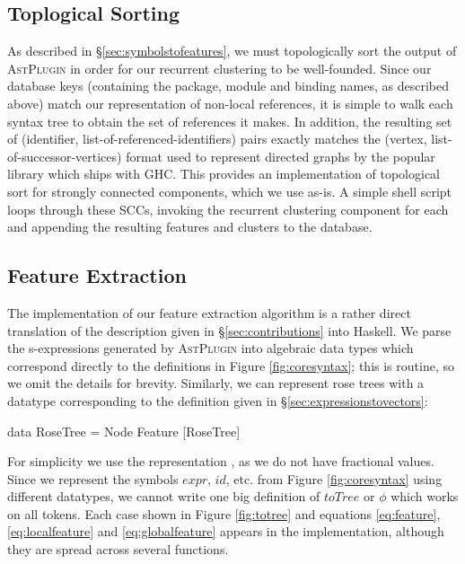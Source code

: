 \subsection{Toplogical Sorting}

As described in \S \ref{sec:symbolstofeatures}, we must topologically sort the
output of \textsc{AstPlugin} in order for our recurrent clustering to be
well-founded. Since our database keys (containing the package, module and
binding names, as described above) match our representation of non-local
references, it is simple to walk each syntax tree to obtain the set of
references it makes. In addition, the resulting set of (identifier,
list-of-referenced-identifiers) pairs exactly matches the (vertex,
list-of-successor-vertices) format used to represent directed graphs by the
popular  library which ships with GHC. This provides an
implementation of topological sort for strongly connected components, which we
use as-is. A simple shell script loops through these SCCs, invoking the
recurrent clustering component for each and appending the resulting features and
clusters to the database.

\subsection{Feature Extraction}

The implementation of our feature extraction algorithm is a rather direct
translation of the description given in \S \ref{sec:contributions} into
Haskell. We parse the s-expressions generated by \textsc{AstPlugin} into
algebraic data types which correspond directly to the definitions in Figure
\ref{fig:coresyntax}; this is routine, so we omit the details for
brevity. Similarly, we can represent rose trees with a datatype corresponding to
the definition given in \S \ref{sec:expressionstovectors}:

\begin{haskell}
data RoseTree = Node Feature [RoseTree]
\end{haskell}

For simplicity we use the representation , as we do not have
fractional values. Since we represent the symbols $expr$, $id$, etc. from Figure
\ref{fig:coresyntax} using different datatypes, we cannot write one big
definition of $toTree$ or $\phi$ which works on all tokens. Each case shown in
Figure \ref{fig:totree} and equations \ref{eq:feature}, \ref{eq:localfeature}
and \ref{eq:globalfeature} appears in the implementation, although they are
spread across several functions.

